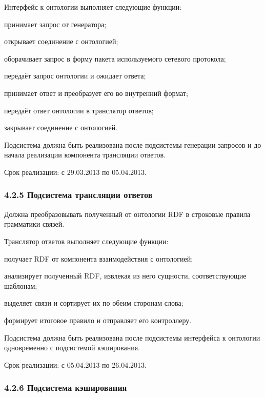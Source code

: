 Интерфейс к онтологии выполняет следующие функции:
\begin{list}{}{\leftmargin=1.5cm}
  \item принимает запрос от генератора;
  \item открывает соединение с онтологией;
  \item оборачивает запрос в форму пакета используемого сетевого протокола;
  \item передаёт запрос онтологии и ожидает ответа;
  \item принимает ответ и преобразует его во внутренний формат;
  \item передаёт ответ онтологии в транслятор ответов;
  \item закрывает соединение с онтологией.
\end{list}

Подсистема должна быть реализована после подсистемы генерации запросов и до начала реализации компонента трансляции ответов.

Срок реализации: с 29.03.2013 по 05.04.2013.

\subsubsection*{4.2.5 Подсистема трансляции ответов}

Должна преобразовывать полученный от онтологии RDF в строковые правила грамматики связей.

Транслятор ответов выполняет следующие функции:
\begin{list}{}{\leftmargin=1.5cm}
  \item получает RDF от компонента взаимодействия с онтологией;
  \item анализирует полученный RDF, извлекая из него сущности, соответствующие шаблонам;
  \item выделяет связи и сортирует их по обеим сторонам слова;
  \item формирует итоговое правило и отправляет его контроллеру.
\end{list}

Подсистема должна быть реализована после подсистемы интерфейса к онтологии одновременно с подсистемой кэширования.

Срок реализации: с 05.04.2013 по 26.04.2013.

\subsubsection*{4.2.6 Подсистема кэширования}

